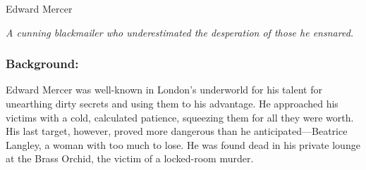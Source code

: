 \begin{WyrdFullNPC}[%
		name=Edward Mercer,%
		description=The Murder Victim,%
		float=!t%
	]{Edward Mercer}
	
    \emph{A cunning blackmailer who underestimated the desperation of those he ensnared.}
    
    \subsubsection*{Background:}
    Edward Mercer was well-known in London’s underworld for his talent for unearthing dirty secrets and using them to his advantage. He approached his victims with a cold, calculated patience, squeezing them for all they were worth. His last target, however, proved more dangerous than he anticipated—Beatrice Langley, a woman with too much to lose. He was found dead in his private lounge at the Brass Orchid, the victim of a locked-room murder.
\end{WyrdFullNPC}
